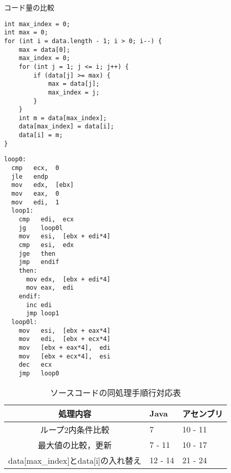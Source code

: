 \begin{table}[h]
  \caption{コード量の比較}
  \label{fig:ソースコード}
\begin{minipage}[t]{0.6\linewidth}
  \begin{lstlisting}[caption={Java言語での記述例}]
int max_index = 0;
int max = 0;
for (int i = data.length - 1; i > 0; i--) {
    max = data[0];
    max_index = 0;
    for (int j = 1; j <= i; j++) {
        if (data[j] >= max) {
            max = data[j];
            max_index = j;
        }
    }
    int m = data[max_index];
    data[max_index] = data[i];
    data[i] = m;
}
  \end{lstlisting}
\end{minipage}
\begin{minipage}[t]{0.4\linewidth}
  \begin{lstlisting}[caption={アセンブリ言語での記述例}]
loop0:
  cmp   ecx,  0  
  jle   endp
  mov   edx,  [ebx]   
  mov   eax,  0       
  mov   edi,  1
  loop1:
    cmp   edi,  ecx   
    jg    loop0l
    mov   esi,  [ebx + edi*4] 
    cmp   esi,  edx       
    jge   then
    jmp   endif
    then:
      mov edx,  [ebx + edi*4] 
      mov eax,  edi           
    endif:
      inc edi
      jmp loop1
  loop0l:
    mov   esi,  [ebx + eax*4]   
    mov   edi,  [ebx + ecx*4]  
    mov   [ebx + eax*4],  edi  
    mov   [ebx + ecx*4],  esi 
    dec   ecx
    jmp   loop0
  \end{lstlisting}
\end{minipage}
\end{table}
\begin{table}[h]
  \caption{ソースコードの同処理手順行対応表}
  \label{tab:対応表}
  \centering
  \begin{tabular}{cll}
    処理内容 & Java & アセンブリ\\ \hline
    ループ2内条件比較 & 7 & 10 - 11\\
    最大値の比較，更新 & 7 - 11 & 10 - 17\\
    data[max\_index]とdata[i]の入れ替え & 12 - 14 & 21 - 24\\ \hline
  \end{tabular}
\end{table}
